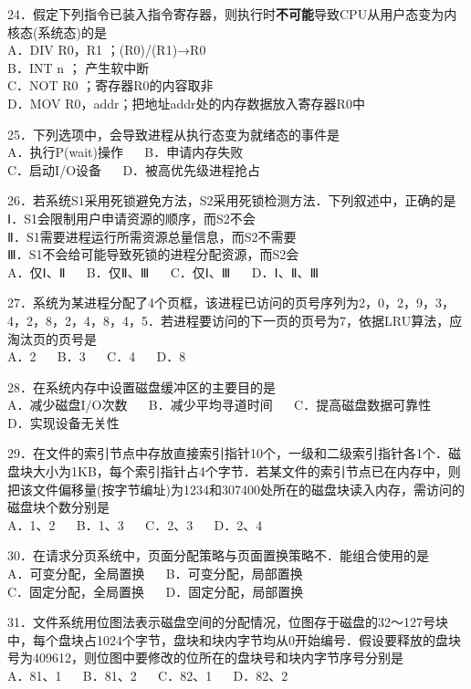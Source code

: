24．假定下列指令已装入指令寄存器，则执行时\textbf{不可能}导致CPU从用户态变为内核态(系统态)的是 \\
A．DIV R0，R1 ；(R0)/(R1)→R0 \\
B．INT n ； 产生软中断 \\
C．NOT R0 ；寄存器R0的内容取非 \\
D．MOV R0，addr；把地址addr处的内存数据放入寄存器R0中

25．下列选项中，会导致进程从执行态变为就绪态的事件是 \\
A．执行P(wait)操作 $\quad$ B．申请内存失败 \\
C．启动I/O设备 $\quad$ D．被高优先级进程抢占

26．若系统S1采用死锁避免方法，S2采用死锁检测方法．下列叙述中，正确的是 \\
Ⅰ．S1会限制用户申请资源的顺序，而S2不会 \\
Ⅱ．S1需要进程运行所需资源总量信息，而S2不需要 \\
Ⅲ．S1不会给可能导致死锁的进程分配资源，而S2会 \\
A．仅Ⅰ、Ⅱ $\quad$ B．仅Ⅱ、Ⅲ $\quad$ C．仅Ⅰ、Ⅲ $\quad$ D．Ⅰ、Ⅱ、Ⅲ

27．系统为某进程分配了4个页框，该进程已访问的页号序列为2，0，2，9，3，4，2，8，2，4，8，4，5．若进程要访问的下一页的页号为7，依据LRU算法，应淘汰页的页号是 \\
A．2 $\quad$ B．3 $\quad$ C．4 $\quad$ D．8

28．在系统内存中设置磁盘缓冲区的主要目的是 \\
A．减少磁盘I/O次数 $\quad$ B．减少平均寻道时间 $\quad$ C．提高磁盘数据可靠性 $\quad$ D．实现设备无关性

29．在文件的索引节点中存放直接索引指针10个，一级和二级索引指针各1个．磁盘块大小为1KB，每个索引指针占4个字节．若某文件的索引节点已在内存中，则把该文件偏移量(按字节编址)为1234和307400处所在的磁盘块读入内存，需访问的磁盘块个数分别是 \\
A．1、2 $\quad$ B．1、3 $\quad$ C．2、3 $\quad$ D．2、4

30．在请求分页系统中，页面分配策略与页面置换策略不．能组合使用的是 \\
A．可变分配，全局置换 $\quad$ B．可变分配，局部置换 \\
C．固定分配，全局置换 $\quad$ D．固定分配，局部置换

31．文件系统用位图法表示磁盘空间的分配情况，位图存于磁盘的32～127号块中，每个盘块占1024个字节，盘块和块内字节均从0开始编号．假设要释放的盘块号为409612，则位图中要修改的位所在的盘块号和块内字节序号分别是 \\
A．81、1 $\quad$ B．81、2 $\quad$ C．82、1 $\quad$ D．82、2

